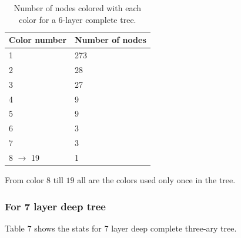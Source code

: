\documentclass{article}
\theoremstyle{remark}
\begin{document}
\begin{table}[h]
    \centering
    \begin{tabular}{|l|l|}
        \hline
        \textbf{Color number} & \textbf{Number of nodes} \\ \hline
        1                     & 273                                          \\ \hline
        2                     & 28                                           \\ \hline
        3                     & 27                                           \\ \hline
        4                     & 9                                           \\ \hline
        5                     & 9                                           \\ \hline
        6                     & 3                                           \\ \hline
        7                     & 3                                           \\ \hline
        8 $\to$ 19& 1                                           \\ \hline
    \end{tabular}
    \caption{Number of nodes colored with each color for a 6-layer complete tree.}
    \label{tab:colors}
\end{table}

From color $8$ till $19$ all are the colors used only once in the tree.

\subsubsection{For 7 layer deep tree}
Table $7$ shows the stats for 7 layer deep complete three-ary tree.
\end{document}
